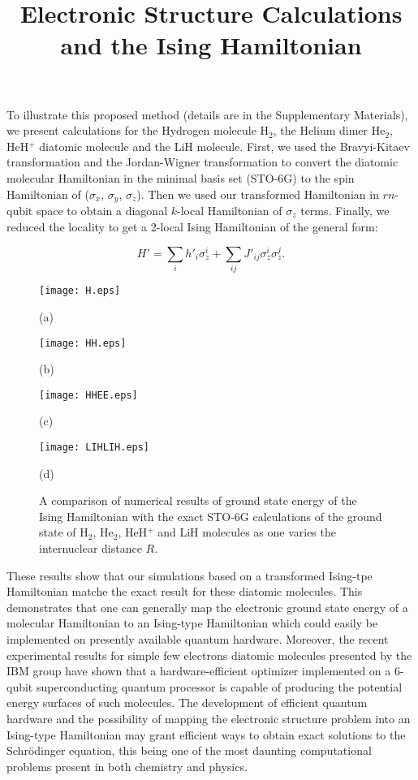 \documentclass{article}
\newcommand\z[1]{\sigma_z^{#1}}\title{Electronic Structure Calculations and the Ising Hamiltonian}
\begin{document}
To illustrate this proposed method (details are in the Supplementary Materials), we present calculations for the Hydrogen molecule H$_2$, the Helium dimer He$_2$, HeH$^+$ diatomic molecule and the LiH molecule. First, we used the Bravyi-Kitaev transformation and the Jordan-Wigner transformation to convert the diatomic molecular Hamiltonian
in the minimal basis set (STO-6G) to the spin Hamiltonian of ($\sigma_x$, $\sigma_y$, $\sigma_z$). Then we used our transformed Hamiltonian in $r n $-qubit space to obtain a diagonal $k$-local Hamiltonian of $\sigma_z$ terms. Finally, we reduced the locality 
to get a 2-local Ising Hamiltonian of the general form:

\begin{equation}
H'=\sum_i h'_{i}\z{i}+\sum_{ij} J'_{ij}\z{i}\z{j} .
\end{equation}


\begin{figure}[h]
\begin{minipage}[t]{0.5\linewidth}
\centering
\texttt{[image: H.eps]}
\caption*{(a)}
\label{fig:side:a}
\end{minipage}%
\begin{minipage}[t]{0.5\linewidth}
\centering
\texttt{[image: HH.eps]}
\caption*{(b)}
\label{fig:side:b}
\end{minipage}
\begin{minipage}[t]{0.5\linewidth}
\centering
\texttt{[image: HHEE.eps]}
\caption*{(c)}
\label{fig:side:c}
\end{minipage}
\begin{minipage}[t]{0.5\linewidth}
\centering
\texttt{[image: LIHLIH.eps]}
\caption*{(d)}
\label{fig:side:d}
\end{minipage}
\caption{A comparison of numerical results of ground state energy of the Ising Hamiltonian with the exact STO-6G calculations of the ground state of H$_2$, He$_2$, HeH$^+$ and LiH molecules as one varies the internuclear distance $R$.}
\end{figure}

These results show that our simulations based on a transformed Ising-tpe Hamiltonian matche the exact result for these diatomic molecules. This demonstrates that one can generally map the electronic ground state energy of a molecular Hamiltonian to an Ising-type Hamiltonian which could easily be implemented on presently available quantum hardware. Moreover, the recent experimental results for simple few electrons diatomic molecules presented by the IBM group have shown that a hardware-efficient optimizer implemented on a 6-qubit superconducting quantum processor is capable of producing the potential energy surfaces of such molecules\cite{Jay}.
The development of efficient quantum hardware and the possibility of mapping the electronic structure problem into an Ising-type Hamiltonian may grant efficient ways to obtain exact solutions to the Schr\"odinger equation, this being one of the most daunting computational problems present in both chemistry and physics.
\end{document}
